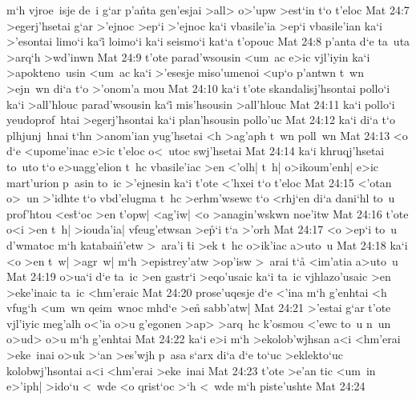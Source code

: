 m`h
vjroe~isje
de~i
g`ar
p'a\r{n}ta
gen'esjai
>all>
o>'upw
>est`in
t`o
t'eloc\bibvsend
\vs Mat 24:7
>egerj'hsetai
g`ar
>'ejnoc
>ep`i
>'ejnoc
ka`i
vbasile'ia
>ep`i
vbasile'ian
ka`i
>'esontai
limo`i
ka`i\r{}
loimo`i
ka`i
seismo`i
kat`a
t'opouc\bibvsend
\vs Mat 24:8
p'anta
d`e
ta~uta
>arq`h
>wd'inwn\bibvsend
\vs Mat 24:9
t'ote
parad'wsousin
<um~ac
e>ic
vjl'iyin
ka`i
>apokteno~usin
<um~ac
ka`i
>'esesje
miso'umenoi
<up`o
p'antwn
t~wn
>ejn~wn
di`a
t`o
>'onom'a
mou\bibvsend
\vs Mat 24:10
ka`i
t'ote
skandalisj'hsontai
pollo`i
ka`i
>all'hlouc
parad'wsousin
ka`i\r{}
mis'hsousin
>all'hlouc\bibvsend
\vs Mat 24:11
ka`i
pollo`i
yeudoprof~htai
>egerj'hsontai
ka`i
plan'hsousin
pollo'uc\bibvsend
\vs Mat 24:12
ka`i
di`a
t`o
plhjunj~hnai
t`hn
>anom'ian
yug'hsetai
<h
>ag'aph
t~wn
poll~wn\bibvsend
\vs Mat 24:13
<o
d`e
<upome'inac
e>ic
t'eloc
o<~utoc
swj'hsetai\bibvsend
\vs Mat 24:14
ka`i
khruqj'hsetai
to~uto
t`o
e>uagg'elion
t~hc
vbasile'iac
>en
<'olh|
t~h|
o>ikoum'enh|
e>ic
mart'urion
p~asin
to~ic
>'ejnesin
ka`i
t'ote
<'hxei
t`o
t'eloc\bibvsend
\vs Mat 24:15
<'otan
o>~un
>'idhte
t`o
vbd'elugma
t~hc
>erhm'wsewc
t`o
<rhj`en
di`a
dani`hl
to~u
prof'htou
<es\r{t}`oc
>en
t'opw|
<ag'iw|
<o
>anagin'wskwn
noe'itw\bibvsend
\vs Mat 24:16
t'ote
o<i
>en
t~h|
>iouda'ia|
vfeug'etwsan
>e\r{p}`i
t`a
>'orh\bibvsend
\vs Mat 24:17
<o
>ep`i
to~u
d'wmatoc
m`h
katabai\r{n}'etw
>~ara'i
\r{t}i
>ek
t~hc
o>ik'iac
a>uto~u\bibvsend
\vs Mat 24:18
ka`i
<o
>en
t~w|
>agr~w|
m`h
>epistrey'atw
>op'isw
>~arai
t`a\r{}
<im'atia
a>uto~u\bibvsend
\vs Mat 24:19
o>ua`i
d`e
ta~ic
>en
gastr`i
>eqo'usaic
ka`i
ta~ic
vjhlazo'usaic
>en
>eke'inaic
ta~ic
<hm'eraic\bibvsend
\vs Mat 24:20
prose'uqesje
d`e
<'ina
m`h
g'enhtai
<h
vfug`h
<um~wn
qeim~wnoc
mhd`e
>e\r{n}
sabb'atw|\bibvsend
\vs Mat 24:21
>'estai
g`ar
t'ote
vjl'iyic
meg'alh
o<'ia
o>u
g'egonen
>ap>
>arq~hc
k'osmou
<'ewc
to~u
n~un
o>ud>
o>u
m`h
g'enhtai\bibvsend
\vs Mat 24:22
ka`i
e>i
m`h
>ekolob'wjhsan
a<i
<hm'erai
>eke~inai
o>uk
>`an
>es'wjh
p~asa
s`arx
di`a
d`e
to`uc
>eklekto`uc
kolobwj'hsontai
a<i
<hm'erai
>eke~inai\bibvsend
\vs Mat 24:23
t'ote
>e'an
tic
<um~in
e>'iph|
>ido`u
<~wde
<o
qrist`oc
>`h
<~wde
m`h
piste'ushte\bibvsend
\vs Mat 24:24
